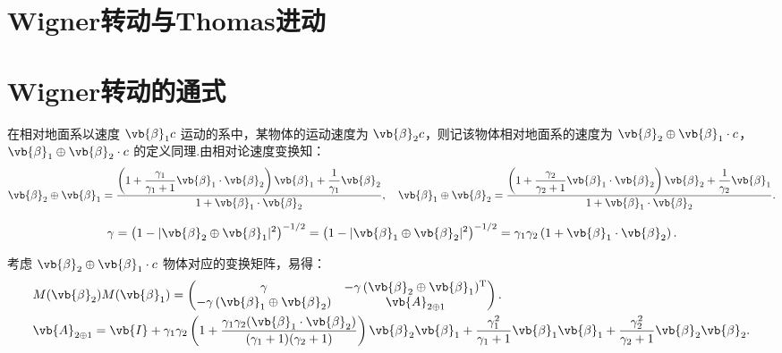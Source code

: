 \section{Wigner转动与Thomas进动}

\section{Wigner转动的通式}

在相对地面系以速度 \(\vb{\beta}_1 c\) 运动的系中，某物体的运动速度为 \(\vb{\beta}_2 c\)，则记该物体相对地面系的速度为 \(\vb{\beta}_2 \oplus \vb{\beta}_1 \cdot c\)，\(\vb{\beta}_1 \oplus \vb{\beta}_2 \cdot c\) 的定义同理.由相对论速度变换知：
\begin{align*}
	\vb{\beta}_2 \oplus \vb{\beta}_1 = \dfrac{ \left(1 + \dfrac{\gamma_1}{\gamma_1 + 1} \vb{\beta}_1 \cdot \vb{\beta}_2 \right) \vb{\beta}_1 + \dfrac{1}{\gamma_1} \vb{\beta}_2 }{ 1 + \vb{\beta}_1 \cdot \vb{\beta}_2 }, \quad
	\vb{\beta}_1 \oplus \vb{\beta}_2 = \dfrac{ \left(1 + \dfrac{\gamma_2}{\gamma_2 + 1} \vb{\beta}_1 \cdot \vb{\beta}_2 \right) \vb{\beta}_2 + \dfrac{1}{\gamma_2} \vb{\beta}_1 }{ 1 + \vb{\beta}_1 \cdot \vb{\beta}_2 }.
\end{align*}

\begin{align*}
	\gamma = \left(1 - |\vb{\beta}_2 \oplus \vb{\beta}_1|^2 \right)^{-1/2} = \left(1 - |\vb{\beta}_1 \oplus \vb{\beta}_2|^2 \right)^{-1/2} = \gamma_1 \gamma_2 \left(1 + \vb{\beta}_1 \cdot \vb{\beta}_2 \right).
\end{align*}

考虑 \(\vb{\beta}_2 \oplus \vb{\beta}_1 \cdot c\) 物体对应的变换矩阵，易得：
\begin{align*}
	&M(\vb{\beta}_2) M(\vb{\beta}_1) =
	\begin{pmatrix}
		\gamma                                        & -\gamma \, (\vb{\beta}_2 \oplus \vb{\beta}_1)^\mathrm{T} \\
		-\gamma \, (\vb{\beta}_1 \oplus \vb{\beta}_2) & \vb{A}_{2 \oplus 1}
	\end{pmatrix}.\\
	&\vb{A}_{2 \oplus 1} = \vb{I} + \gamma_1 \gamma_2 \left(1 + \dfrac{\gamma_1 \gamma_2 (\vb{\beta}_1 \cdot \vb{\beta}_2)}{(\gamma_1 + 1)(\gamma_2 + 1)} \right) \vb{\beta}_2 \vb{\beta}_1 + \dfrac{\gamma_1^2}{\gamma_1 + 1} \vb{\beta}_1 \vb{\beta}_1 + \dfrac{\gamma_2^2}{\gamma_2 + 1} \vb{\beta}_2 \vb{\beta}_2.
\end{align*}


